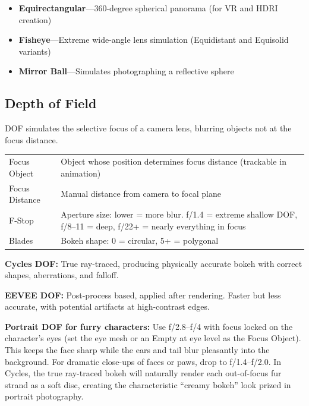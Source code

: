 \begin{itemize}[leftmargin=2em]
  \item \textbf{Equirectangular}---360-degree spherical panorama
        (for VR and HDRI creation)
  \item \textbf{Fisheye}---Extreme wide-angle lens simulation
        (Equidistant and Equisolid variants)
  \item \textbf{Mirror Ball}---Simulates photographing a reflective
        sphere
\end{itemize}

\subsection{Depth of Field}

DOF simulates the selective focus of a camera lens, blurring objects
not at the focus distance.

\begin{center}
\begin{tabularx}{\textwidth}{L{3cm}X}
\toprule
{}
 &  \\
\midrule
Focus Object & Object whose position determines focus distance (trackable in animation) \\
Focus Distance & Manual distance from camera to focal plane \\
F-Stop & Aperture size: lower = more blur. f/1.4 = extreme shallow DOF, f/8--11 = deep, f/22+ = nearly everything in focus \\
Blades & Bokeh shape: 0 = circular, 5+ = polygonal \\
\bottomrule
\end{tabularx}
\end{center}

\textbf{Cycles DOF:} True ray-traced, producing physically accurate
bokeh with correct shapes, aberrations, and falloff.

\textbf{EEVEE DOF:} Post-process based, applied after rendering.
Faster but less accurate, with potential artifacts at high-contrast
edges.

\begin{furrybox}
\textbf{Portrait DOF for furry characters:} Use f/2.8--f/4 with
focus locked on the character's eyes (set the eye mesh or an Empty
at eye level as the Focus Object). This keeps the face sharp while
the ears and tail blur pleasantly into the background. For dramatic
close-ups of faces or paws, drop to f/1.4--f/2.0. In Cycles, the
true ray-traced bokeh will naturally render each out-of-focus fur
strand as a soft disc, creating the characteristic ``creamy bokeh''
look prized in portrait photography.
\end{furrybox}

